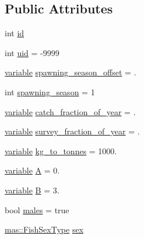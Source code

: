 \subsection*{Public Attributes}
\begin{DoxyCompactItemize}
\item 
int \hyperlink{structmas_1_1_area_population_info_a1794b6f07e5bd538fdce710d62617f71}{id}
\item 
int \hyperlink{structmas_1_1_area_population_info_a718466a245393c1fb6b8ebd03ef346ee}{uid} = -\/9999
\item 
\hyperlink{structmas_1_1_area_population_info_a154b6c5cf71d1241e90b0f0173dbe32c}{variable} \hyperlink{structmas_1_1_area_population_info_aa8014e9618bcf75fdf503c0d8983590b}{spawning\-\_\-season\-\_\-offset} = .
\item 
int \hyperlink{structmas_1_1_area_population_info_a777033e8de0e61461394edc007a12e90}{spawning\-\_\-season} = 1
\item 
\hyperlink{structmas_1_1_area_population_info_a154b6c5cf71d1241e90b0f0173dbe32c}{variable} \hyperlink{structmas_1_1_area_population_info_a686e5f2a86446de54fa3aa3cd0aecba5}{catch\-\_\-fraction\-\_\-of\-\_\-year} = .
\item 
\hyperlink{structmas_1_1_area_population_info_a154b6c5cf71d1241e90b0f0173dbe32c}{variable} \hyperlink{structmas_1_1_area_population_info_a770e532e8ac9f51d0fb6c43dd16a250a}{survey\-\_\-fraction\-\_\-of\-\_\-year} = .
\item 
\hyperlink{structmas_1_1_area_population_info_a154b6c5cf71d1241e90b0f0173dbe32c}{variable} \hyperlink{structmas_1_1_area_population_info_a57d3f8bab19c26fb9e981afcdb80fb4f}{kg\-\_\-to\-\_\-tonnes} = 1000.
\item 
\hyperlink{structmas_1_1_area_population_info_a154b6c5cf71d1241e90b0f0173dbe32c}{variable} \hyperlink{structmas_1_1_area_population_info_aade6418ce6dcfc635ad230e813ff8165}{A} = 0.
\item 
\hyperlink{structmas_1_1_area_population_info_a154b6c5cf71d1241e90b0f0173dbe32c}{variable} \hyperlink{structmas_1_1_area_population_info_a82cc0a8d9e86bd5b6e6152b66601ad88}{B} = 3.
\item 
bool \hyperlink{structmas_1_1_area_population_info_a59115f3aefbc75978d3f83911119cbaa}{males} = true
\item 
\hyperlink{namespacemas_a177aaabcef4ec0c3f390a7c9f6ad563b}{mas\-::\-Fish\-Sex\-Type} \hyperlink{structmas_1_1_area_population_info_a4eb0872d4ac95ec63d9134f5bc0fd29c}{sex}
\item 

\end{DoxyCompactItemize}
